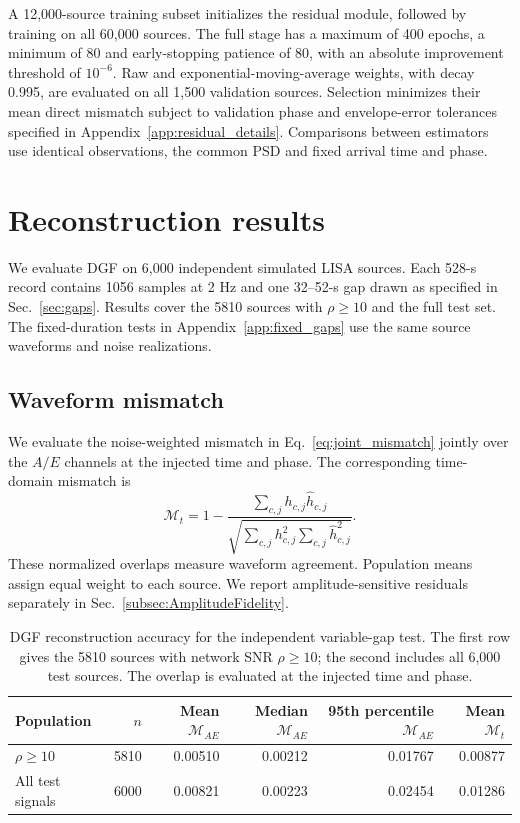 \documentclass[10pt,prd,aps,a4paper,twocolumn,superscriptaddress,nofootinbib,floatfix]{revtex4-2}
\begin{document}
A 12,000-source training subset initializes the residual module, followed by training on all 60,000 sources. The full stage has a maximum of 400 epochs, a minimum of 80 and early-stopping patience of 80, with an absolute improvement threshold of $10^{-6}$. Raw and exponential-moving-average weights, with decay 0.995, are evaluated on all 1,500 validation sources. Selection minimizes their mean direct mismatch subject to validation phase and envelope-error tolerances specified in Appendix~\ref{app:residual_details}. Comparisons between estimators use identical observations, the common PSD and fixed arrival time and phase.

\section{Reconstruction results}\label{sec:results}
We evaluate DGF on 6,000 independent simulated LISA sources. Each 528-s record contains 1056 samples at 2 Hz and one 32--52-s gap drawn as specified in Sec.~\ref{sec:gaps}. Results cover the 5810 sources with $\rho\ge10$ and the full test set. The fixed-duration tests in Appendix~\ref{app:fixed_gaps} use the same source waveforms and noise realizations.

\subsection{Waveform mismatch}\label{subsec:Mismatch}
We evaluate the noise-weighted mismatch in Eq.~\eqref{eq:joint_mismatch} jointly over the $A/E$ channels at the injected time and phase. The corresponding time-domain mismatch is
\begin{equation}
\mathcal M_t=1-\frac{\sum_{c,j}h_{c,j}\widehat h_{c,j}}{\sqrt{\sum_{c,j}h_{c,j}^2\sum_{c,j}\widehat h_{c,j}^2}}.
\end{equation}
These normalized overlaps measure waveform agreement. Population means assign equal weight to each source. We report amplitude-sensitive residuals separately in Sec.~\ref{subsec:AmplitudeFidelity}.

\begin{table}[t]\centering
\caption{DGF reconstruction accuracy for the independent variable-gap test. The first row gives the 5810 sources with network SNR $\rho\ge10$; the second includes all 6,000 test sources. The overlap is evaluated at the injected time and phase.}\label{tab:results}
\begin{tabular}{lrrrrr}\hline\hline
Population & $n$ & Mean $\mathcal M_{AE}$ & Median $\mathcal M_{AE}$ & 95th percentile $\mathcal M_{AE}$ & Mean $\mathcal M_t$\\\hline
$\rho\ge10$ & 5810 & 0.00510 & 0.00212 & 0.01767 & 0.00877 \\
All test signals & 6000 & 0.00821 & 0.00223 & 0.02454 & 0.01286 \\
\hline\hline\end{tabular}\end{table}
\end{document}
